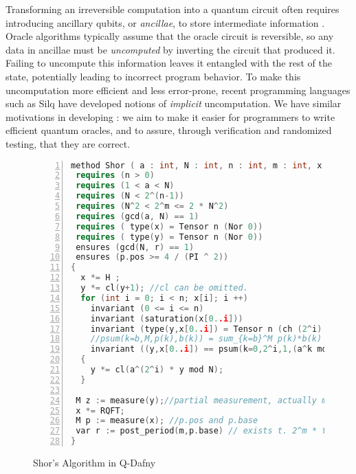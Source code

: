 Transforming an irreversible computation into a quantum circuit often requires introducing ancillary qubits, or \emph{ancillae}, to store intermediate information \cite[Chapter 3.2]{mike-and-ike}.
Oracle algorithms typically assume that the oracle circuit is reversible, so any data in ancillae must be \emph{uncomputed} by inverting the circuit that produced it.
Failing to uncompute this information leaves it entangled with the rest of the state, potentially leading to incorrect program behavior.
To make this uncomputation more efficient and less error-prone, recent programming languages such as Silq \cite{sliqlanguage} have developed notions of \emph{implicit} uncomputation.
We have similar motivations in developing \name: we aim to make it easier for programmers to write efficient quantum oracles, and to assure, through verification and randomized testing, that they are correct.

\begin{figure}[t]
{\small
  \begin{lstlisting}[numbers=left,language=C++,xleftmargin=4 mm]
method Shor ( a : int, N : int, n : int, m : int, x : Q[n], y : Q[n] )
 requires (n > 0)
 requires (1 < a < N)
 requires (N < 2^(n-1))
 requires (N^2 < 2^m <= 2 * N^2)
 requires (gcd(a, N) == 1)
 requires ( type(x) = Tensor n (Nor 0))
 requires ( type(y) = Tensor n (Nor 0))
 ensures (gcd(N, r) == 1)
 ensures (p.pos >= 4 / (PI ^ 2))
{
  x *= H ;
  y *= cl(y+1); //cl can be omitted.
  for (int i = 0; i < n; x[i]; i ++)
    invariant (0 <= i <= n)
    invariant (saturation(x[0..i]))
    invariant (type(y,x[0..i]) = Tensor n (ch (2^i) {k | j baseof x[0..i] && k = (a^j mod N,j)}))
    //psum(k=b,M,p(k),b(k)) = sum_{k=b}^M p(k)*b(k)
    invariant ((y,x[0..i]) == psum(k=0,2^i,1,(a^k mod N,k))) 
  {
    y *= cl(a^(2^i) * y mod N);
  }

 M z := measure(y);//partial measurement, actually measure(y,r) r is the period
 x *= RQFT;
 M p := measure(x); //p.pos and p.base
 var r := post_period(m,p.base) // exists t. 2^m * t / r = p.base
}
  \end{lstlisting}
}
\caption{Shor's Algorithm in Q-Dafny}
\label{fig:shorexample}
\end{figure}

